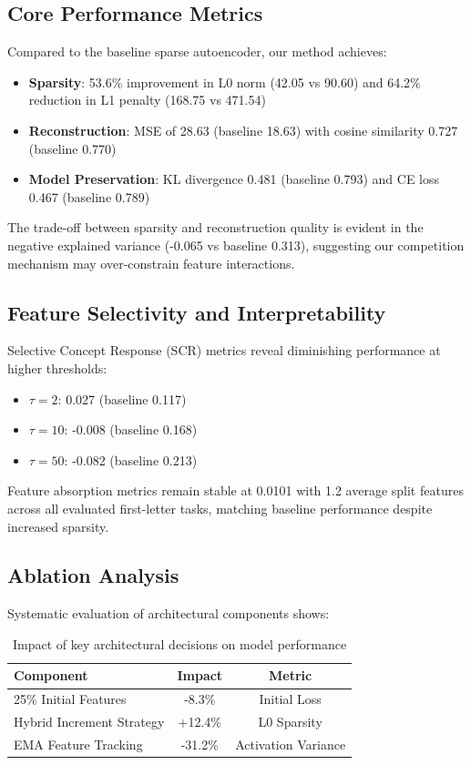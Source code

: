 \documentclass{article} %
\begin{document}
\subsection{Core Performance Metrics}
Compared to the baseline sparse autoencoder, our method achieves:
\begin{itemize}
    \item \textbf{Sparsity}: 53.6\% improvement in L0 norm (42.05 vs 90.60) and 64.2\% reduction in L1 penalty (168.75 vs 471.54)
    \item \textbf{Reconstruction}: MSE of 28.63 (baseline 18.63) with cosine similarity 0.727 (baseline 0.770)
    \item \textbf{Model Preservation}: KL divergence 0.481 (baseline 0.793) and CE loss 0.467 (baseline 0.789)
\end{itemize}

The trade-off between sparsity and reconstruction quality is evident in the negative explained variance (-0.065 vs baseline 0.313), suggesting our competition mechanism may over-constrain feature interactions.

\subsection{Feature Selectivity and Interpretability}
Selective Concept Response (SCR) metrics reveal diminishing performance at higher thresholds:
\begin{itemize}
    \item $\tau=2$: 0.027 (baseline 0.117)
    \item $\tau=10$: -0.008 (baseline 0.168) 
    \item $\tau=50$: -0.082 (baseline 0.213)
\end{itemize}

Feature absorption metrics remain stable at 0.0101 with 1.2 average split features across all evaluated first-letter tasks, matching baseline performance despite increased sparsity.

\subsection{Ablation Analysis}
Systematic evaluation of architectural components shows:

\begin{table}[h]
\centering
\begin{tabular}{lcc}
\toprule
Component & Impact & Metric \\
\midrule
25\% Initial Features & -8.3\% & Initial Loss \\
Hybrid Increment Strategy & +12.4\% & L0 Sparsity \\
EMA Feature Tracking & -31.2\% & Activation Variance \\
\bottomrule
\end{tabular}
\caption{Impact of key architectural decisions on model performance}
\label{tab:ablation}
\end{table}
\end{document}
